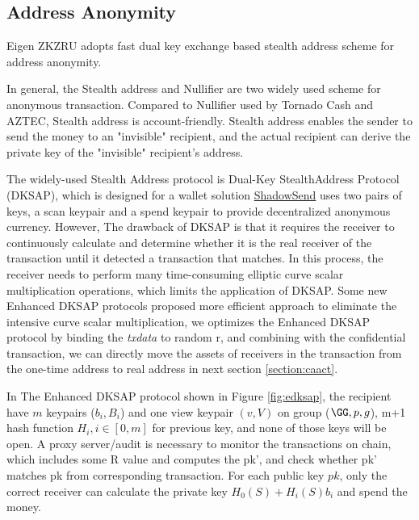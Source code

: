 
\subsection{Address Anonymity}

Eigen ZKZRU adopts fast dual key exchange based stealth address scheme for address anonymity. 

In general, the Stealth address and Nullifier are two widely used scheme for anonymous
transaction. Compared to Nullifier used by Tornado Cash and AZTEC, Stealth address is account-friendly. Stealth address enables the sender to send the money to an "invisible" recipient, and the actual recipient can derive the private key of the "invisible" recipient's address. 

The widely-used Stealth Address protocol is Dual-Key StealthAddress Protocol (DKSAP), which is designed for a wallet solution \href{https://github.com/shadowproject}{ShadowSend} uses two pairs of keys, a scan keypair and a spend keypair to provide decentralized anonymous currency. However, The drawback of DKSAP is that it requires the receiver to continuously calculate and determine whether it is the real receiver of the transaction until it detected a transaction that matches. In this process, the receiver needs to perform many time-consuming elliptic curve scalar multiplication operations, which limits the application of DKSAP. Some new Enhanced DKSAP protocols \cite{courtois2017stealth} proposed more efficient approach to eliminate the intensive curve scalar multiplication, we optimizes the Enhanced DKSAP protocol by binding the \textit{txdata} to random r, and combining with the confidential transaction, we can directly move the assets of receivers in the transaction from the one-time address to real address in next section \ref{section:caact}. 

In The Enhanced DKSAP protocol shown in Figure \ref{fig:edksap}, the recipient have $m$ keypairs ($b_i, B_i$) and one view keypair $(v, V)$ on group ($\GG, p, g$), m+1 hash function $H_i, i \in [0, m]$ for previous key, and none of those keys will be open. A proxy server/audit is necessary to monitor the transactions on chain, which includes some R value and computes the pk', and check whether pk' matches pk from corresponding transaction. For each public key $pk$, only the correct receiver can calculate the private key $H_0(S)+H_i(S)b_i$ and spend the money. 

